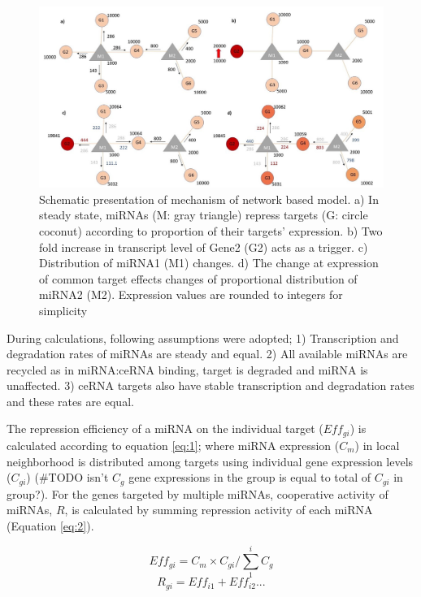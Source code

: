 \documentclass[]{article}
\begin{document}
\begin{figure}
\hypertarget{fig1}{%
\centering
\includegraphics{Fig1.jpg}
\caption{Schematic presentation of mechanism of network based model. a)
In steady state, miRNAs (M: gray triangle) repress targets (G: circle
coconut) according to proportion of their targets' expression. b) Two
fold increase in transcript level of Gene2 (G2) acts as a trigger. c)
Distribution of miRNA1 (M1) changes. d) The change at expression of
common target effects changes of proportional distribution of miRNA2
(M2). Expression values are rounded to integers for
simplicity}\label{fig1}
}
\end{figure}

During calculations, following assumptions were adopted; 1)
Transcription and degradation rates of miRNAs are steady and equal. 2)
All available miRNAs are recycled as in miRNA:ceRNA binding, target is
degraded and miRNA is unaffected. 3) ceRNA targets also have stable
transcription and degradation rates and these rates are equal.

The repression efficiency of a miRNA on the individual target
(\(Eff_{gi}\)) is calculated according to equation \eqref{eq:1}; where
miRNA expression (\(C_m\)) in local neighborhood is distributed among
targets using individual gene expression levels (\(C_{gi}\)) (\#TODO
isn't \(C_g\) gene expressions in the group is equal to total of
\(C_{gi}\) in group?). For the genes targeted by multiple miRNAs,
cooperative activity of miRNAs, \(R\), is calculated by summing
repression activity of each miRNA (Equation \eqref{eq:2}).

\begin{equation} 
    Eff_{gi}= C_m \times C_{gi}/\sum_{1}^{i} C_g \tag{1}\label{eq:1}
\end{equation} \begin{equation}
   R_{gi}= Eff_{i1} + Eff_{i2} ... \tag{2}\label{eq:2}
\end{equation}
\end{document}

